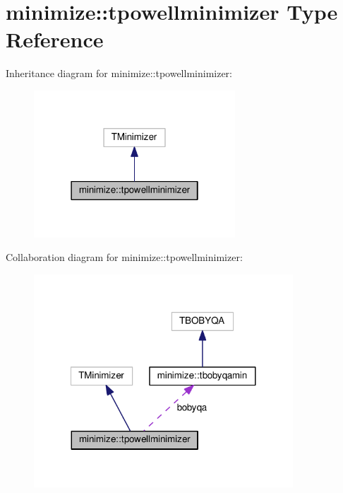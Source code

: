 \hypertarget{structminimize_1_1tpowellminimizer}{}\section{minimize\+:\+:tpowellminimizer Type Reference}
\label{structminimize_1_1tpowellminimizer}


Inheritance diagram for minimize\+:\+:tpowellminimizer\+:
\nopagebreak
\begin{figure}[H]
\begin{center}
\leavevmode
\includegraphics[width=214pt]{structminimize_1_1tpowellminimizer__inherit__graph}
\end{center}
\end{figure}


Collaboration diagram for minimize\+:\+:tpowellminimizer\+:
\nopagebreak
\begin{figure}[H]
\begin{center}
\leavevmode
\includegraphics[width=275pt]{structminimize_1_1tpowellminimizer__coll__graph}
\end{center}
\end{figure}
